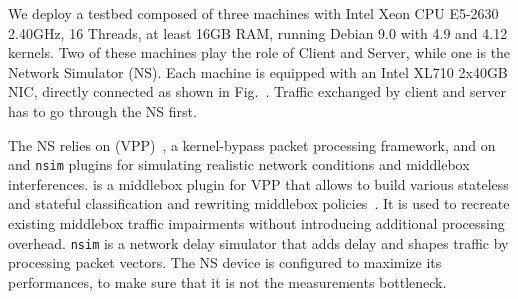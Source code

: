  

 We deploy a testbed composed of three machines with Intel Xeon CPU E5-2630
2.40GHz, 16 Threads, at least 16GB RAM, running Debian 9.0 with 4.9 and
4.12 kernels. Two of these machines play the role of Client and Server,
while one is the Network Simulator (NS). Each machine is equipped with an
Intel XL710 2x40GB NIC, directly connected as shown in Fig.~.
Traffic exchanged by client and server has to go through the NS first.
 
The NS relies on  (VPP)~\cite{vpp}, a
kernel-bypass packet processing framework, and on \mmb and \texttt{nsim}
plugins for simulating realistic network conditions and middlebox
interferences. \mmb is a middlebox plugin for VPP that allows to build various
stateless and stateful classification and rewriting middlebox
policies~\cite{edeline2019mmb}. It is used to recreate existing middlebox
traffic impairments without introducing additional processing overhead.
\texttt{nsim} is a network delay simulator that adds delay and shapes traffic
by processing packet vectors. The NS device is configured to maximize
its performances, to make sure that it is not the measurements bottleneck.


